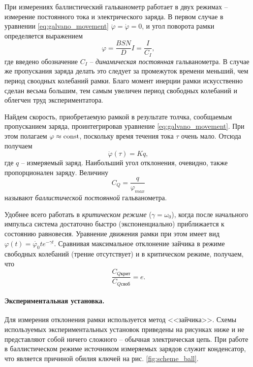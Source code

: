 \documentclass{lab_class}
\begin{document}
При измерениях баллистический гальванометр работает в двух режимах -- измерение постоянного тока и электрического заряда. В первом случае в уравнении \eqref{eq:galvano_movement} $\ddot{\varphi} = \dot{\varphi} = 0$, и угол поворота рамки определяется выражением
\begin{equation*}
	\varphi = \frac{BSN}{D} I = \frac{I}{C_I},
\end{equation*}
где введено обозначение $C_I$ -- \emph{динамическая постоянная} гальванометра. В случае же пропускания заряда делать это следует за промежуток времени меньший, чем период своодных колебаний рамки. Благо момент инерции рамки искусственно сделан весьма большим, тем самым увеличен период свободных колебаний и облегчен труд экспериментатора. 

Найдем скорость, приобретаемую рамкой в результате толчка, сообщаемым пропусканием заряда, проинтегрировав уравнение \eqref{eq:galvano_movement}. При этом полагаем $\varphi \approx \text{const}$, поскольку время течения тока $\tau$ очень мало. Отсюда получаем
\begin{equation*}
	\dot{\varphi}(\tau) = Kq,
\end{equation*}
где $q$ -- измеряемый заряд. Наибольший угол отклонения, очевидно, также пропорционален заряду. Величину
\begin{equation*}
	C_Q = \frac{q}{\varphi_{max}}
\end{equation*}
называют \emph{баллистической постоянной} гальванометра.

Удобнее всего работать в \emph{критическом режиме} ($\gamma = \omega_0$), когда после начального импульса система достаточно быстро (экспоненциально) приближается к состоянию равновесия. Уравнение движения рамки при этом имеет вид $\varphi(t) = \dot{\varphi_0} t e^{-\gamma t}$. Сравнивая максимальное отклонение зайчика в режиме свободных колебаний (трение отсутствует) и в критическом режиме, получаем, что
\begin{equation*}
	\frac{C_{Q\text{крит}}}{C_{Q\text{своб}}} = e.
\end{equation*}

\paragraph{Экспериментальная установка.}

Для измерения отклонения рамки используется метод <<зайчика>>. Схемы используемых экспериментальных установок приведены на рисунках ниже и не представляют собой ничего сложного -- обычная электрическая цепь. При работе в баллистическом режиме источником измеряемых зарядов служит конденсатор, что является причиной обилия ключей на рис. \ref{fig:scheme_ball}.
\end{document}
